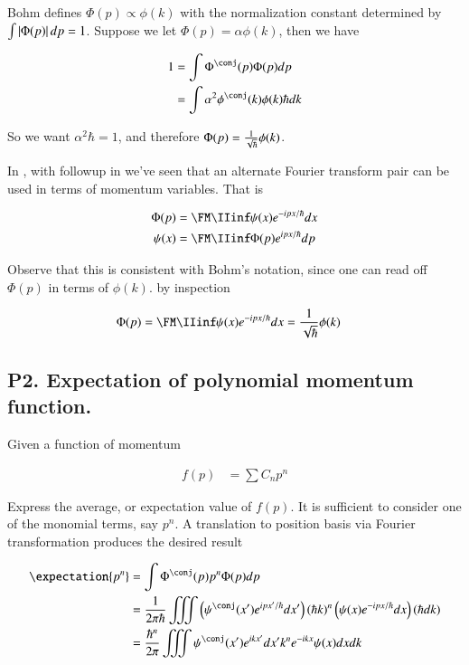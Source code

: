 Bohm defines $\Phi(p) \propto \phi(k)$ with the normalization constant determined by $\int \left\lvert{\Phi(p)}\right\rvert dp = 1$.  Suppose we 
let $\Phi(p) = \alpha \phi(k)$, then we have

\begin{align*}
1 
&= \int \Phi^\conj(p) \Phi(p) dp \\
&= \int \alpha^2 \phi^\conj(k) \phi(k) \hbar d k
\end{align*}

So we want $\alpha^2 \hbar = 1$, and therefore $\Phi(p) = \frac{1}{\sqrt{\hbar}} \phi(k)$.

In \citep{mcmahon2005qmd}, with followup in \citep{PJqmFourier} we've seen that an alternate Fourier transform pair can be used in terms of
momentum variables.  That is

\begin{align*}
\Phi(p) &= \FM \IIinf \psi(x) e^{-ipx/\hbar} dx \\
\psi(x) &= \FM \IIinf \Phi(p) e^{ipx/\hbar} dp \\
\end{align*}

Observe that this is consistent with Bohm's notation, since one can read off 
$\Phi(p)$ in terms of $\phi(k)$.
by inspection

\begin{align*}
\Phi(p) &= \FM \IIinf \psi(x) e^{-ipx/\hbar} dx = \inv{\sqrt{\hbar}} \phi(k)
\end{align*}

\subsection{P2. Expectation of polynomial momentum function. }

Given a function of momentum 

\begin{align*}
f(p) &= \sum C_n p^n
\end{align*}

Express the average, or expectation value of $f(p)$.  It is sufficient to consider one of the monomial terms, say $p^n$.  A translation 
to position basis via Fourier transformation produces the desired result

\begin{align*}
\expectation{p^n} 
&= \int \Phi^\conj(p) p^n \Phi(p) dp \\
&= \inv{2\pi \hbar} \iiint \left( \psi^\conj(x') e^{ipx'/\hbar} dx' \right) (\hbar k)^n \left( \psi(x) e^{-ipx/\hbar} dx \right) (\hbar dk) \\
&= \frac{\hbar^n}{2\pi } \iiint \psi^\conj(x') e^{ikx'} dx' k^n e^{-i k x} \psi(x) dx dk \\
\end{align*}

